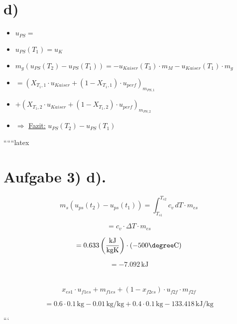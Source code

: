 

\section*{d)}

\begin{itemize}
    \item $u_{PS} =$
    \item $u_{PS} (T_1) = u_{K}$
    \item $m_g (u_{PS} (T_2) - u_{PS} (T_1)) = -u_{Kaiser} (T_3) \cdot m_{M} - u_{Kaiser} (T_1) \cdot m_{g}$
    \item $= (X_{T_1,1} \cdot u_{Kaiser} + (1 - X_{T_1,1}) \cdot u_{perf})_{m_{PS,1}}$
    \item $+ (X_{T_1,2} \cdot u_{Kaiser} + (1 - X_{T_1,2}) \cdot u_{perf})_{m_{PS,2}}$
    \item $\Rightarrow$ \underline{Fazit:} $u_{PS} (T_2) - u_{PS} (T_1)$
\end{itemize}

``````latex

\section*{Aufgabe 3) d).}

\[
m_s \left( u_{ps}(t_2) - u_{ps}(t_1) \right) = \int_{T_{s1}}^{T_{s2}} c_v \, dT \cdot m_{es}
\]

\[
= c_v \cdot \Delta T \cdot m_{es}
\]

\[
= 0.633 \left( \frac{\text{kJ}}{\text{kgK}} \right) \cdot (-500 \degree \text{C})
\]

\[
= -7.092 \, \text{kJ}
\]

\section*{}

\[
x_{es1} \cdot u_{f1es} + m_{f1es} + (1 - x_{f2es}) \cdot u_{f2f} \cdot m_{f2f}
\]

\[
= 0.6 \cdot 0.1 \, \text{kg} - 0.01 \, \text{kg/kg} + 0.4 \cdot 0.1 \, \text{kg} - 133.418 \, \text{kJ/kg}
\]

```